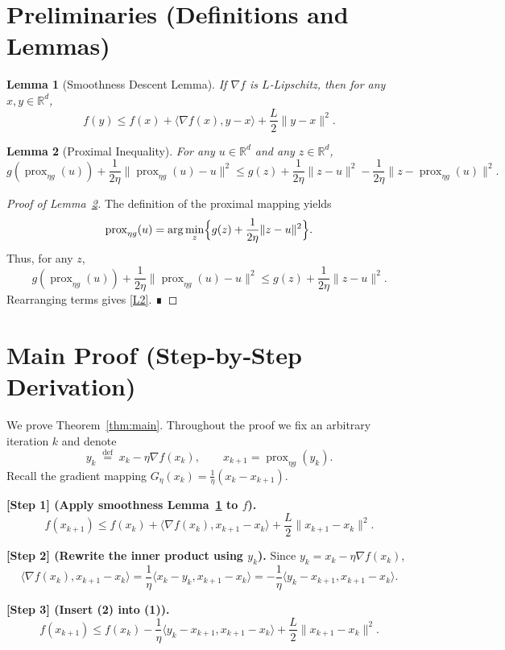 \documentclass{article}
\newtheorem{lemma}{Lemma}
\newcommand{\prox}{\operatorname{prox}}
\newcommand{\grad}{\nabla}
\newcommand{\R}{\mathbb{R}}
\begin{document}
\section*{Preliminaries (Definitions and Lemmas)}
\begin{lemma}[Smoothness Descent Lemma]
\label{lem:smooth}
If $\grad f$ is $L$‑Lipschitz, then for any $x,y\in\R^{d}$,
\[
f(y)\le f(x)+\langle\grad f(x),y-x\rangle+\frac{L}{2}\|y-x\|^{2}.
\tag{L1}
\]
\end{lemma}
\begin{lemma}[Proximal Inequality]
\label{lem:prox-ineq}
For any $u\in\R^{d}$ and any $z\in\R^{d}$,
\[
g(\prox_{\eta g}(u))+\frac{1}{2\eta}\|\prox_{\eta g}(u)-u\|^{2}
\le g(z)+\frac{1}{2\eta}\|z-u\|^{2}
-\frac{1}{2\eta}\|z-\prox_{\eta g}(u)\|^{2}.
\tag{L2}
\]
\end{lemma}
\begin{proof}[Proof of Lemma~\ref{lem:prox-ineq}]
The definition of the proximal mapping yields
\[
\prox_{\eta g}(u)=\arg\min_{z}\Bigl\{g(z)+\frac{1}{2\eta}\|z-u\|^{2}\Bigr\}.
\]
Thus, for any $z$,
\[
g(\prox_{\eta g}(u))+\frac{1}{2\eta}\|\prox_{\eta g}(u)-u\|^{2}
\le g(z)+\frac{1}{2\eta}\|z-u\|^{2}.
\]
Rearranging terms gives \eqref{L2}. ∎
\end{proof}

\section*{Main Proof (Step‑by‑Step Derivation)}
We prove Theorem~\ref{thm:main}. Throughout the proof we fix an arbitrary iteration $k$ and denote
\[
y_k \;\stackrel{\mathrm{def}}{=}\; x_k-\eta\grad f(x_k),\qquad
x_{k+1}= \prox_{\eta g}(y_k).
\]
Recall the gradient mapping $G_{\eta}(x_k)=\frac{1}{\eta}(x_k-x_{k+1})$.

\bigskip
\noindent\textbf{[Step 1] (Apply smoothness Lemma~\ref{lem:smooth} to $f$).}
\[
f(x_{k+1}) \le f(x_k)+\langle\grad f(x_k),x_{k+1}-x_k\rangle
+\frac{L}{2}\|x_{k+1}-x_k\|^{2}.
\tag{1}
\]

\noindent\textbf{[Step 2] (Rewrite the inner product using $y_k$).}
Since $y_k=x_k-\eta\grad f(x_k)$,
\[
\langle\grad f(x_k),x_{k+1}-x_k\rangle
= \frac{1}{\eta}\langle x_k-y_k, x_{k+1}-x_k\rangle
= -\frac{1}{\eta}\langle y_k-x_{k+1}, x_{k+1}-x_k\rangle.
\tag{2}
\]

\noindent\textbf{[Step 3] (Insert (2) into (1)).}
\[
f(x_{k+1}) \le f(x_k)-\frac{1}{\eta}\langle y_k-x_{k+1}, x_{k+1}-x_k\rangle
+\frac{L}{2}\|x_{k+1}-x_k\|^{2}.
\tag{3}
\]
\end{document}
